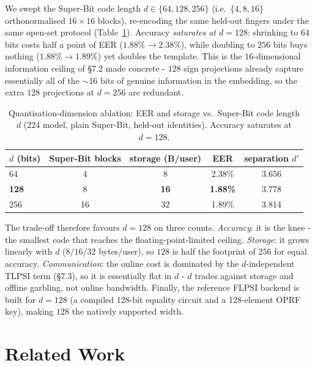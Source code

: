 \documentclass[11pt,a4paper]{article}
\begin{document}
We swept the Super-Bit code length $d\in\{64,128,256\}$ (i.e.\ $\{4,8,16\}$ orthonormalised
$16\times16$ blocks), re-encoding the same held-out fingers under the same open-set protocol
(Table~\ref{tab:dimabl}). Accuracy \emph{saturates at $d=128$}: shrinking to $64$ bits costs
half a point of EER ($1.88\%\to2.38\%$), while doubling to $256$ bits buys nothing
($1.88\%\to1.89\%$) yet doubles the template. This is the $16$-dimensional information ceiling
of \S7.2 made concrete - $128$ sign projections already capture essentially all of the
$\sim$16 bits of genuine information in the embedding, so the extra $128$ projections at $d=256$
are redundant.

\begin{table}[h]
\centering
\caption{Quantisation-dimension ablation: EER and storage vs.\ Super-Bit code length $d$
(224 model, plain Super-Bit, held-out identities). Accuracy saturates at $d=128$.}
\label{tab:dimabl}
\begin{tabular}{lcccc}
\hline
$d$ (bits) & Super-Bit blocks & storage (B/user) & EER & separation $d'$ \\
\hline
64           & 4  & 8  & 2.38\% & 3.656 \\
\textbf{128} & 8  & \textbf{16} & \textbf{1.88\%} & 3.778 \\
256          & 16 & 32 & 1.89\% & 3.814 \\
\hline
\end{tabular}
\end{table}

The trade-off therefore favours $d=128$ on three counts. \emph{Accuracy}: it is the knee -
the smallest code that reaches the floating-point-limited ceiling. \emph{Storage}: it grows
linearly with $d$ ($8/16/32$ bytes/user), so $128$ is half the footprint of $256$ for equal
accuracy. \emph{Communication}: the online cost is dominated by the $d$-independent TLPSI term
(\S7.3), so it is essentially flat in $d$ - $d$ trades against storage and offline garbling,
not online bandwidth. Finally, the reference FLPSI backend is built for $d=128$ (a compiled
128-bit equality circuit and a 128-element OPRF key), making $128$ the natively supported width.



\section{Related Work}
\end{document}
